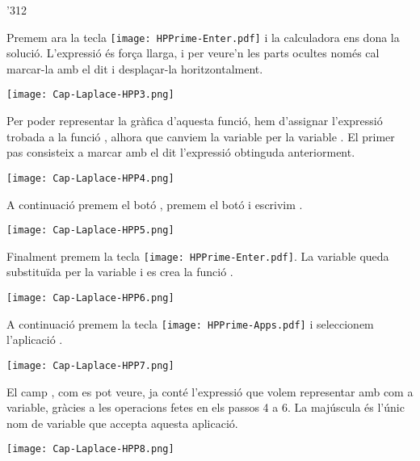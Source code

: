 \begin{exemple}
\begin{dingautolist}{'312}
         \item Premem ara la tecla \texttt{[image: HPPrime-Enter.pdf]} i la calculadora ens dona la solució. L'expressió és força llarga, i per veure'n les parts ocultes només cal marcar-la amb el dit i desplaçar-la horitzontalment.

            \texttt{[image: Cap-Laplace-HPP3.png]}\vspace{5mm}

         \item Per  poder representar la gràfica d'aquesta funció, hem d'assignar l'expressió trobada a la  funció , alhora que canviem la variable  per la variable . El primer pas consisteix a marcar amb el dit l'expressió obtinguda anteriorment.

            \texttt{[image: Cap-Laplace-HPP4.png]}\vspace{5mm}

         \item A continuació premem el botó  , premem el botó  i  escrivim  .

             \texttt{[image: Cap-Laplace-HPP5.png]}\vspace{5mm}

         \item Finalment premem la tecla \texttt{[image: HPPrime-Enter.pdf]}. La variable  queda substituïda per la variable  i es crea la funció .

          \texttt{[image: Cap-Laplace-HPP6.png]}\vspace{5mm}


         \item A continuació premem  la tecla \texttt{[image: HPPrime-Apps.pdf]} i seleccionem  l'aplicació .

            \texttt{[image: Cap-Laplace-HPP7.png]}\vspace{5mm}

          \item El camp  , com es pot veure, ja conté l'expressió que volem representar amb   com a variable, gràcies a les operacions fetes en els passos 4 a 6. La  majúscula és l'únic nom de variable que accepta aquesta aplicació.

            \texttt{[image: Cap-Laplace-HPP8.png]}\vspace{5mm}


\end{dingautolist}
\end{exemple}
